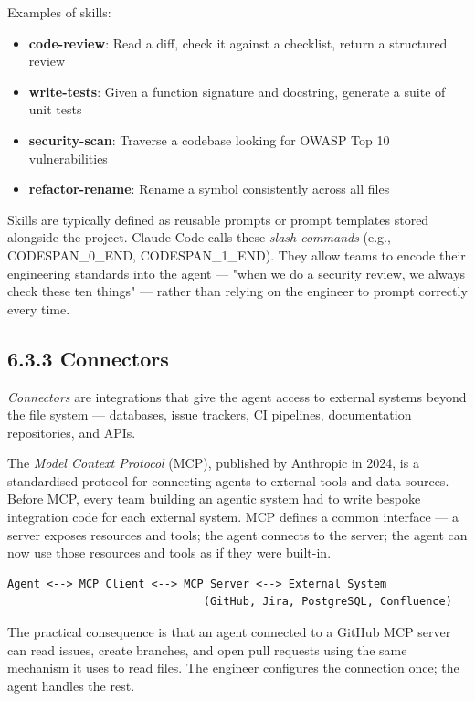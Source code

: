 \documentclass[11pt,a4paper]{book}
\begin{document}
Examples of skills:

\begin{itemize}
  \item \textbf{code-review}: Read a diff, check it against a checklist, return a structured review
  \item \textbf{write-tests}: Given a function signature and docstring, generate a suite of unit tests
  \item \textbf{security-scan}: Traverse a codebase looking for OWASP Top 10 vulnerabilities
  \item \textbf{refactor-rename}: Rename a symbol consistently across all files
\end{itemize}

Skills are typically defined as reusable prompts or prompt templates stored alongside the project. Claude Code calls these \textit{slash commands} (e.g., CODESPAN\_0\_END, CODESPAN\_1\_END). They allow teams to encode their engineering standards into the agent --- "when we do a security review, we always check these ten things" --- rather than relying on the engineer to prompt correctly every time.

\subsection{6.3.3 Connectors}

\textit{Connectors} are integrations that give the agent access to external systems beyond the file system --- databases, issue trackers, CI pipelines, documentation repositories, and APIs.

The \textit{Model Context Protocol} (MCP), published by Anthropic in 2024, is a standardised protocol for connecting agents to external tools and data sources. Before MCP, every team building an agentic system had to write bespoke integration code for each external system. MCP defines a common interface --- a server exposes resources and tools; the agent connects to the server; the agent can now use those resources and tools as if they were built-in.

\begin{lstlisting}
Agent <--> MCP Client <--> MCP Server <--> External System
                              (GitHub, Jira, PostgreSQL, Confluence)
\end{lstlisting}

The practical consequence is that an agent connected to a GitHub MCP server can read issues, create branches, and open pull requests using the same mechanism it uses to read files. The engineer configures the connection once; the agent handles the rest.
\end{document}
